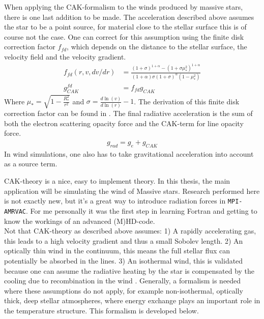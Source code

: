 When applying the CAK-formalism to the winds produced by massive stars, there is one last addition to be made. The acceleration described above assumes the star to be a point source, for material close to the stellar surface this is of course not the case. One can correct for this assumption using the finite disk correction factor $f_{fd}$, which depends on the distance to the stellar surface, the velocity field and the velocity gradient.
\begin{align}
f_{fd}(r,v,dv/dr) &= \frac{(1 + \sigma)^{1+\alpha}-(1+\sigma \mu_*^2)^{1+\alpha}}{(1+\alpha)\sigma(1+\sigma)^\alpha(1-\mu_*^2)} \\ \label{eq: fin_disk_corr}
g_{CAK}^{fd} &= f_{fd} g_{CAK}
\end{align}
Where $\mu_* = \sqrt{1-\frac{R_*^2}{r^2}}$ and $\sigma = \frac{d \ln(v)}{d\ln(r)}-1$. The derivation of this finite disk correction factor can be found in \citep{Owocki2003}. The final radiative acceleration is the sum of both the electron scattering opacity force and the CAK-term for line opacity force.\\
\begin{align}
g_{rad} = g_e + g_{CAK}
\end{align} 
In wind simulations, one also has to take gravitational acceleration into account as a source term.

CAK-theory is a nice, easy to implement theory. In this thesis, the main application will be simulating the wind of Massive stars. Research performed here is not exactly new, but it's a great way to introduce radiation forces in \texttt{MPI-AMRVAC}. For me personally it was the first step in learning Fortran and getting to know the workings of an advanced (M)HD-code.\\

Not that CAK-theory as described above assumes: 1) A rapidly accelerating gas, this leads to a high velocity gradient and thus a small Sobolev length. 2) An optically thin wind in the continuum, this means the full stellar flux can potentially be absorbed in the lines. 3) An isothermal wind, this is validated because one can assume the radiative heating by the star is compensated by the cooling due to recombination in the wind \citep{}. Generally, a formalism is needed where these assumptions do not apply, for example non-isothermal, optically thick, deep stellar atmospheres, where energy exchange plays an important role in the temperature structure. This formalism is developed below.


